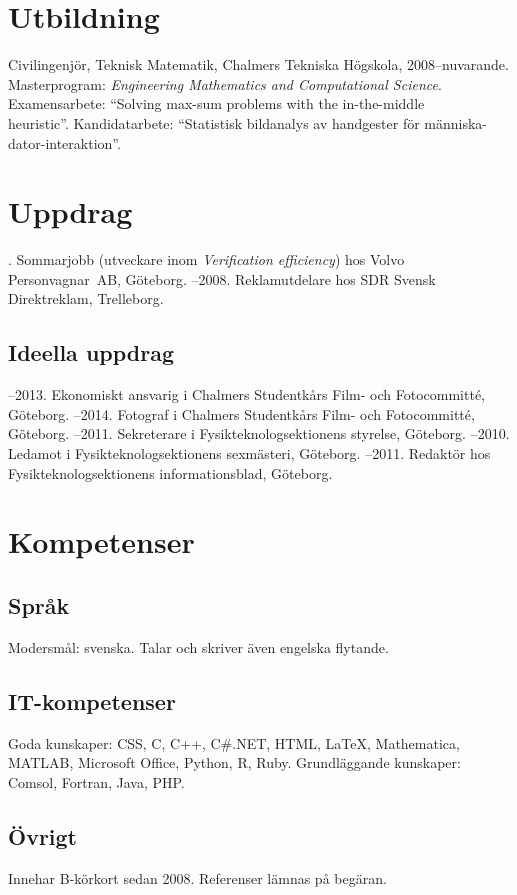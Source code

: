 \documentclass{skvitae}
\author{Simon Sigurdhsson}
\affiliation{}
\begin{document}
	\maketitle

	\section{Utbildning}
	\ind Civilingenjör, Teknisk Matematik, Chalmers Tekniska Högskola, 2008--nuvarande.\\%
		 Masterprogram: \emph{Engineering Mathematics and Computational Science}.\\%
		 Examensarbete: \foreignquote{english}{Solving max-sum problems with the in-the-middle\\heuristic}. %
		 Kandidatarbete: \enquote{Statistisk bildanalys av handgester för människa-dator-interaktion}.

	\section{Uppdrag}
	. Sommarjobb (utveckare inom \emph{Verification efficiency}) hos Volvo Person\-vagnar~AB, Göteborg.
	--2008. Reklamutdelare hos SDR Svensk Direktreklam, Trelleborg.

	\medskip
	\subsection{Ideella uppdrag}
	--2013. Ekonomiskt ansvarig i Chalmers Studentkårs Film- och Fotocommitté, Göteborg.
	--2014. Fotograf i Chalmers Studentkårs Film- och Fotocommitté, Göteborg.
	--2011. Sekreterare i Fysikteknologsektionens styrelse, Göteborg.
	--2010. Ledamot i Fysikteknologsektionens sexmästeri, Göteborg.
	--2011. Redaktör hos Fysikteknologsektionens informationsblad, Göteborg.

	\section{Kompetenser}
	\subsection{Språk}
	\ind Modersmål: svenska. Talar och skriver även engelska flytande.

	\medskip
	\subsection{IT-kompetenser}
	\ind Goda kunskaper: CSS, C, C++, C\#.NET, HTML, \LaTeX, Mathematica, MATLAB, Microsoft Office, Python, R, Ruby.
	\ind Grundläggande kunskaper: Comsol, Fortran, Java, PHP.

	\medskip
	\subsection{Övrigt}
	\ind Innehar B-körkort sedan 2008.
	\ind Referenser lämnas på begäran.
\end{document}
